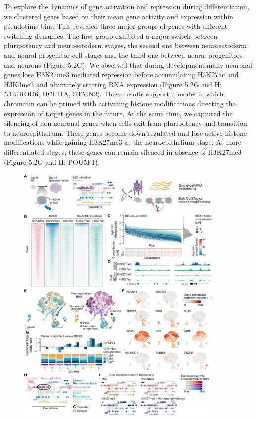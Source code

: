 To explore the dynamics of gene activation and repression during differentiation, we clustered genes based on their mean gene activity and expression within pseudotime bins. This revealed three major groups of genes with different switching dynamics. The first group exhibited a major switch between pluripotency and neuroectoderm stages, the second one between neuroectoderm and neural progenitor cell stages and the third one between neural progenitors and neurons (Figure 5.2G). We observed that during development many neuronal genes lose H3K27me3 mediated repression before accumulating H3K27ac and H3K4me3 and ultimately starting RNA expression (Figure 5.2G and H; NEUROD6, BCL11A, STMN2). These results support a model in which chromatin can be primed with activating histone modifications directing the expression of target genes in the future. At the same time, we captured the silencing of non-neuronal genes when cells exit from pluripotency and transition to neuroepithelium. These genes become down-regulated and lose active histone modifications while gaining H3K27me3 at the neuroepithelium stage. At more differentiated stages, these genes can remain silenced in absence of H3K27me3 (Figure 5.2G and H; POU5F1).

\begin{figure}[b!]
    \centering
	\includegraphics[width=0.9\textwidth]{figures/cnt/Figure_3}
    \label{fig:cnt2}
\end{figure}

